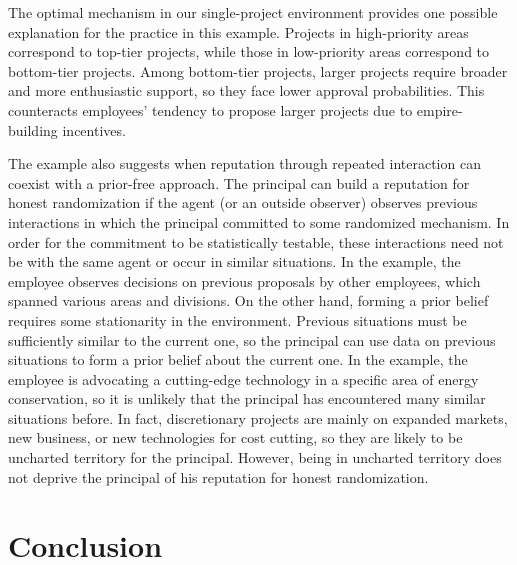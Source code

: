 \documentclass[12pt,english]{article}
\theoremstyle{remark}
\theoremstyle{plain}
\theoremstyle{definition}
\begin{document}
The optimal mechanism in our single-project environment provides one possible explanation for the practice in this example. Projects in high-priority areas correspond to top-tier projects, while those in low-priority areas correspond to bottom-tier projects. Among bottom-tier projects, larger projects require broader and more enthusiastic support, so they face lower approval probabilities. This counteracts employees' tendency to propose larger projects due to empire-building incentives.



The example also suggests when reputation through repeated interaction can coexist with a prior-free approach. The principal can build a reputation for honest randomization if the agent (or an outside observer) observes previous interactions in which the principal committed to some randomized mechanism. In order for the commitment to be statistically testable, these interactions need not be with the same agent or occur in similar situations. In the example, the employee observes decisions on previous proposals by other employees, which spanned various areas and divisions. On the other hand, forming a prior belief requires some stationarity in the environment. Previous situations must be sufficiently similar to the current one, so the principal can use data on previous situations to form a prior belief about the current one. In the example, the employee is advocating a cutting-edge technology in a specific area of energy conservation, so it is unlikely that the principal has encountered many similar situations before. In fact, discretionary projects are mainly on expanded markets, new business, or new technologies for cost cutting, so they are likely to be uncharted territory for the principal. However, being in uncharted territory does not deprive the principal of his reputation for honest randomization. 


\section{Conclusion}

\end{document}
